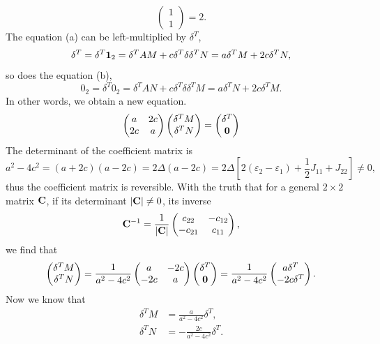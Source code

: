 \documentclass[a4paper]{book}
\newcounter{solution}[chapter]
\newcommand{\C}{{\bf C}}
\newcommand{\I}{{\bf 1}}
\begin{document}
\begin{solution}
\begin{itemize}
\[\begin{pmatrix}
			1 \\ 1
		\end{pmatrix} = 2.
	\]
	The equation (a) can be left-multiplied by $\delta^T$,
	\[
		\delta^T = \delta^T \I_2 = \delta^T A M + c \delta^T \delta \delta^T N = a \delta^T M + 2c \delta^T N , 
	\]	
	so does the equation (b),	
	\[
		0_2 = \delta^T 0_2 = \delta^T A N + c \delta^T \delta \delta^T M = a \delta^T N + 2c \delta^T M .
	\]
	In other words, we obtain a new equation.
	\[
		\begin{pmatrix}
			a & 2c \\ 2c & a 
		\end{pmatrix} \begin{pmatrix}
			\delta^T M \\ \delta^T N
		\end{pmatrix} = \begin{pmatrix}
			\delta^T \\ {\bf 0}
		\end{pmatrix}
	\]
	The determinant of the coefficient matrix is 
	\[
		a^2 - 4c^2 = (a+2c)(a-2c) = 2\Delta ( a-2c ) = 2\Delta \left[ 2(\varepsilon_2 - \varepsilon_1) + \frac{1}{2} J_{11} + J_{22} \right] \neq 0,
	\]
	thus the coefficient matrix is reversible. With the truth that for a general $2 \times 2$ matrix $\C$, if its determinant $|\C| \neq 0$, its inverse
	\[
		\C^{-1} = \frac{1}{ | \C| } \begin{pmatrix}
			c_{22} & -c_{12} \\ -c_{21} & c_{11}
		\end{pmatrix},
	\] 
	we find that
	\[
		\begin{pmatrix}
			\delta^T M \\ \delta^T N
		\end{pmatrix} = \frac{1}{a^2 - 4c^2} \begin{pmatrix}
			a & -2c \\ -2c & a 
		\end{pmatrix} \begin{pmatrix}
			\delta^T \\ {\bf 0}
		\end{pmatrix} = \frac{1}{a^2 - 4c^2} \begin{pmatrix}
			a \delta^T \\ -2c \delta^T
		\end{pmatrix}.
	\]
	Now we know that 
	\begin{align*}
		\delta^T M &= \frac{ a }{ a^2 - 4c^2 } \delta^T , \\
		\delta^T N &= - \frac{ 2c }{ a^2 - 4c^2 } \delta^T.
	\end{align*}

\end{itemize}
\end{solution}
\end{document}
